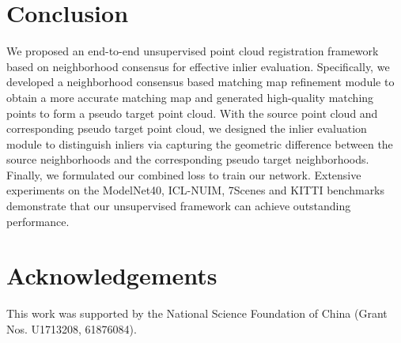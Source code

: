 \documentclass[letterpaper]{article} %
\begin{document}
	\section{Conclusion}
	We proposed an end-to-end unsupervised point cloud registration framework based on neighborhood consensus for effective inlier evaluation. Specifically, we developed a neighborhood consensus based matching map refinement module to obtain a more accurate matching map and generated high-quality matching points to form a pseudo target point cloud. With the source point cloud and corresponding pseudo target point cloud, we designed the inlier evaluation module to distinguish inliers via capturing the geometric difference between the source neighborhoods and the corresponding pseudo target neighborhoods.
	Finally, we formulated our combined loss to train our network. Extensive experiments on the ModelNet40, ICL-NUIM, 7Scenes and KITTI benchmarks demonstrate that our unsupervised framework can achieve outstanding performance.
	\section{Acknowledgements}
	This work was supported by the National Science Foundation of China (Grant Nos. U1713208, 61876084).
	{
		
		
	}
\end{document}
